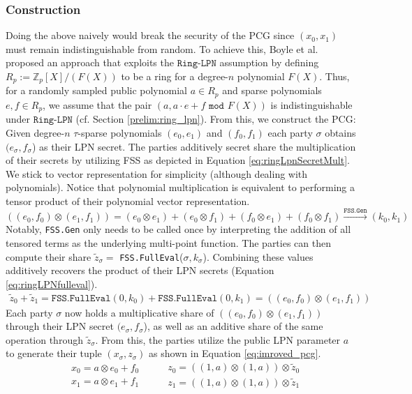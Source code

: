 \subsubsection{Construction}
Doing the above naively would break the security of the PCG since $(x_0, x_1)$ must remain indistinguishable from random. To achieve this, Boyle et al. \cite{boyle2020efficient} proposed an approach that exploits the $\texttt{Ring-LPN}$ assumption by defining $R_p:=\mathbb{Z}_{p}[X]/(F(X))$ to be a ring for a degree-$n$ polynomial $F(X)$. Thus, for a randomly sampled public polynomial $a \in R_p$ and sparse polynomials $e,f\in R_p$, we assume that the pair $(a, a\cdot e+f \texttt{ mod } F(X))$ is indistinguishable under $\texttt{Ring-LPN}$ (cf. Section \ref{prelim:ring_lpn}). From this, we construct the PCG: Given degree-$n$ $\tau$-sparse polynomials $(e_0, e_1)$ and $(f_0, f_1)$ each party $\sigma$ obtains $(e_\sigma, f_\sigma$) as their LPN secret. The parties additively secret share the multiplication of their secrets by utilizing FSS as depicted in Equation \ref{eq:ringLpnSecretMult}.  We stick to vector representation for simplicity (although dealing with polynomials). Notice that polynomial multiplication is equivalent to performing a tensor product of their polynomial vector representation. 
\begin{equation}
((e_0, f_0) \otimes (e_1, f_1)) = (e_0 \otimes e_1) + (e_0 \otimes f_1) + (f_0 \otimes e_1) + (f_0 \otimes f_1) \overset{\texttt{FSS.Gen}}{\longrightarrow} (k_0, k_1)
\label{eq:ringLpnSecretMult}
\end{equation}
Notably, \texttt{FSS.Gen} only needs to be called once by interpreting the addition of all tensored terms as the underlying multi-point function. The parties can then compute their share $\tilde{z}_\sigma =$ \texttt{FSS.FullEval}($\sigma, k_\sigma$). Combining these values additively recovers the product of their LPN secrets (Equation \ref{eq:ringLPNfulleval}).
\begin{equation}
\begin{aligned}
\tilde{z}_0 + \tilde{z}_1 = \texttt{FSS.FullEval}(0, k_0) + \texttt{FSS.FullEval}(0, k_1) = ((e_0, f_0) \otimes (e_1, f_1)) 
\label{eq:ringLPNfulleval}
\end{aligned}
\end{equation}
Each party $\sigma$ now holds a multiplicative share of $((e_0, f_0) \otimes (e_1, f_1))$ through their LPN secret $(e_\sigma, f_\sigma$), as well as an additive share of the same operation through  $\tilde{z}_\sigma$. From this, the parties utilize the public LPN parameter $a$ to generate their tuple $(x_\sigma, z_\sigma)$ as shown in Equation \ref{eq:imroved_pcg}.
\begin{equation}
\begin{aligned}
& x_0 = a\otimes e_0 + f_0 \\
& x_1 = a\otimes e_1 + f_1
\end{aligned}
\:\:\:\:\:\:
\begin{aligned}
& z_0 = ((1,a)\otimes(1,a)) \otimes \tilde{z}_0 \\
& z_1 = ((1,a)\otimes(1,a)) \otimes \tilde{z}_1 
\end{aligned}
\label{eq:imroved_pcg}
\end{equation}

